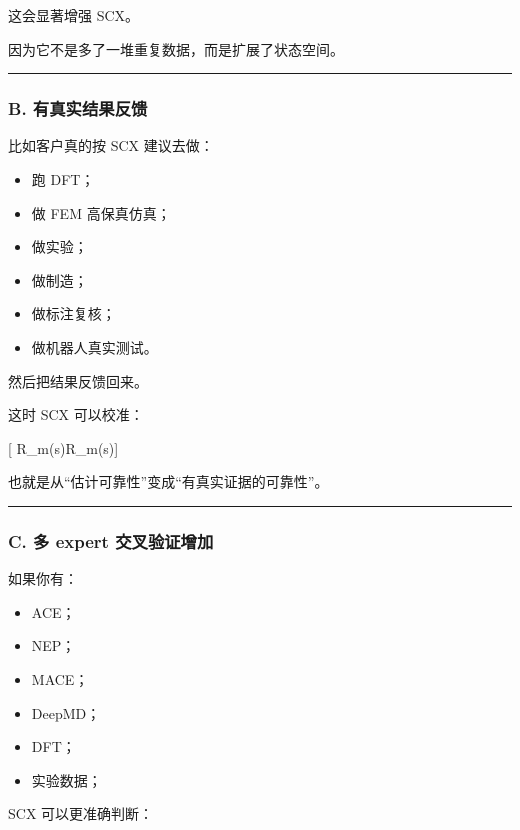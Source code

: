 \documentclass[
  12pt,
]{ctexart}
\providecommand{\tightlist}{%
  \setlength{\itemsep}{0pt}\setlength{\parskip}{0pt}}
\begin{document}
这会显著增强 SCX。

因为它不是多了一堆重复数据，而是扩展了状态空间。

\begin{center}\rule{0.5\linewidth}{0.5pt}\end{center}

\subsubsection{B.
有真实结果反馈}\label{b.-ux6709ux771fux5b9eux7ed3ux679cux53cdux9988}

比如客户真的按 SCX 建议去做：

\begin{itemize}
\tightlist
\item
  跑 DFT；
\item
  做 FEM 高保真仿真；
\item
  做实验；
\item
  做制造；
\item
  做标注复核；
\item
  做机器人真实测试。
\end{itemize}

然后把结果反馈回来。

这时 SCX 可以校准：

{[} \widehat R\_m(s)\rightarrow R\_m(s){]}

也就是从``估计可靠性''变成``有真实证据的可靠性''。

\begin{center}\rule{0.5\linewidth}{0.5pt}\end{center}

\subsubsection{C. 多 expert
交叉验证增加}\label{c.-ux591a-expert-ux4ea4ux53c9ux9a8cux8bc1ux589eux52a0}

如果你有：

\begin{itemize}
\tightlist
\item
  ACE；
\item
  NEP；
\item
  MACE；
\item
  DeepMD；
\item
  DFT；
\item
  实验数据；
\end{itemize}

SCX 可以更准确判断：
\end{document}
